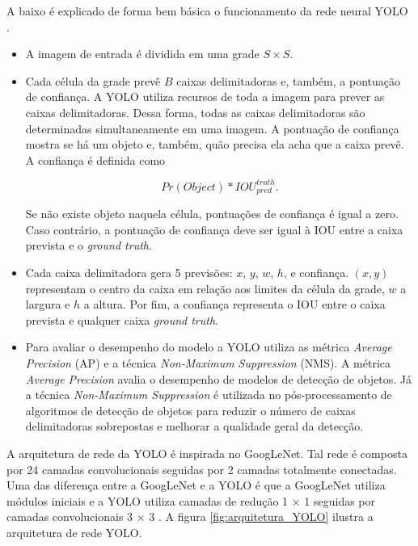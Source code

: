 A baixo é explicado de forma bem básica o funcionamento da rede neural YOLO \cite{yolo1}.

\begin{itemize}
	\item A imagem de entrada é dividida em uma grade $S \times S$.
	
	\item Cada célula da grade prevê $B$ caixas delimitadoras e, também, a pontuação de confiança. A YOLO utiliza recursos de toda a imagem para prever as caixas delimitadoras. Dessa forma, todas as caixas delimitadoras são determinadas simultaneamente em uma imagem. A pontuação de confiança mostra se há um objeto e, também, quão precisa ela acha que a caixa prevê. A confiança é definida como 
	
	\begin{equation}
		Pr(Object) \ast IOU^{truth}_{pred}.
	\end{equation} 
	
	Se não existe objeto naquela célula, pontuações de confiança é igual a zero. Caso contrário, a pontuação de confiança deve ser igual à IOU entre a caixa prevista e o \textit{ground truth}.
	
	\item Cada caixa delimitadora gera 5 previsões: $x$, $y$, $w$, $h$, e confiança. $(x, y)$ representam o centro da caixa em relação aos limites da célula da grade, $w$ a largura e $h$ a altura. Por fim, a confiança representa o IOU entre o caixa prevista e qualquer caixa \textit{ground truth}.
	
	\item Para avaliar o desempenho do modelo a YOLO utiliza as métrica \textit{Average Precision} (AP) e a técnica \textit{Non-Maximum Suppression} (NMS). A métrica \textit{Average Precision} avalia o desempenho de modelos de detecção de objetos. Já a técnica \textit{Non-Maximum Suppression} é utilizada no pós-processamento de algoritmos de detecção de objetos para reduzir o número de caixas delimitadoras sobrepostas e melhorar a qualidade geral da detecção.
\end{itemize} 

A arquitetura de rede da YOLO é inspirada no GoogLeNet. Tal rede é composta por 24 camadas convolucionais seguidas por 2 camadas totalmente conectadas. Uma das diferença entre a GoogLeNet e a YOLO é que a GoogLeNet utiliza módulos iniciais e a YOLO utiliza camadas de redução 1 × 1 seguidas por camadas convolucionais 3 × 3 \cite{yolo1}. A figura \ref{fig:arquitetura_YOLO} ilustra a arquitetura de rede YOLO.

